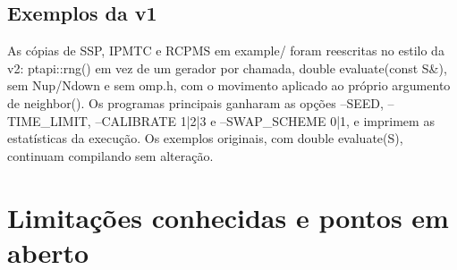 \documentclass[10pt,a4paper]{article}
\newcommand{\code}[1]{{\ttfamily #1}}
\begin{document}
\subsection*{Exemplos da v1}

As cópias de SSP, IPMTC e RCPMS em \code{example/\allowbreak{}} foram reescritas no estilo da v2: \code{ptapi::rng()} em vez de um gerador por chamada, \code{double evaluate(\allowbreak{}const S\&)}, sem \code{Nup}/\code{Ndown} e sem \code{omp.h}, com o movimento aplicado ao próprio argumento de \code{neighbor()}. Os programas principais ganharam as opções \code{--SEED}, \code{--TIME\_\allowbreak{}LIMIT}, \code{--CALIBRATE 1|2|3} e \code{--SWAP\_\allowbreak{}SCHEME 0|1}, e imprimem as estatísticas da execução. Os exemplos originais, com \code{double evaluate(\allowbreak{}S)}, continuam compilando sem alteração.

\section{Limitações conhecidas e pontos em aberto}\label{s11}
\end{document}
